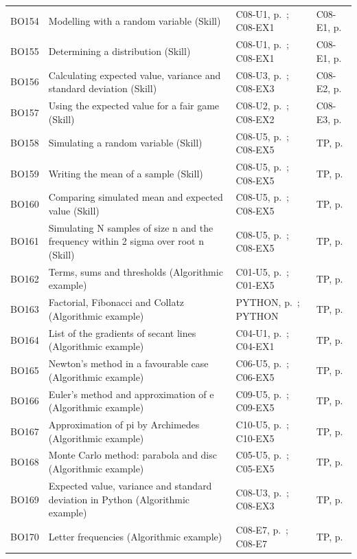 \begin{longtable}{p{.1\linewidth}p{.43\linewidth}p{.19\linewidth}p{.16\linewidth}}
BO154 & Modelling with a random variable (Skill) & C08-U1, p.\,\pageref{C08-U1} ; C08-EX1 & C08-E1, p.\,\pageref{C08-E1} \\
BO155 & Determining a distribution (Skill) & C08-U1, p.\,\pageref{C08-U1} ; C08-EX1 & C08-E1, p.\,\pageref{C08-E1} \\
BO156 & Calculating expected value, variance and standard deviation (Skill) & C08-U3, p.\,\pageref{C08-U3} ; C08-EX3 & C08-E2, p.\,\pageref{C08-E2} \\
BO157 & Using the expected value for a fair game (Skill) & C08-U2, p.\,\pageref{C08-U2} ; C08-EX2 & C08-E3, p.\,\pageref{C08-E3} \\
BO158 & Simulating a random variable (Skill) & C08-U5, p.\,\pageref{C08-U5} ; C08-EX5 & TP, p.\,\pageref{TP} \\
BO159 & Writing the mean of a sample (Skill) & C08-U5, p.\,\pageref{C08-U5} ; C08-EX5 & TP, p.\,\pageref{TP} \\
BO160 & Comparing simulated mean and expected value (Skill) & C08-U5, p.\,\pageref{C08-U5} ; C08-EX5 & TP, p.\,\pageref{TP} \\
BO161 & Simulating N samples of size n and the frequency within 2 sigma over root n (Skill) & C08-U5, p.\,\pageref{C08-U5} ; C08-EX5 & TP, p.\,\pageref{TP} \\
BO162 & Terms, sums and thresholds (Algorithmic example) & C01-U5, p.\,\pageref{C01-U5} ; C01-EX5 & TP, p.\,\pageref{TP} \\
BO163 & Factorial, Fibonacci and Collatz (Algorithmic example) & PYTHON, p.\,\pageref{PYTHON} ; PYTHON & TP, p.\,\pageref{TP} \\
BO164 & List of the gradients of secant lines (Algorithmic example) & C04-U1, p.\,\pageref{C04-U1} ; C04-EX1 & TP, p.\,\pageref{TP} \\
BO165 & Newton's method in a favourable case (Algorithmic example) & C06-U5, p.\,\pageref{C06-U5} ; C06-EX5 & TP, p.\,\pageref{TP} \\
BO166 & Euler's method and approximation of e (Algorithmic example) & C09-U5, p.\,\pageref{C09-U5} ; C09-EX5 & TP, p.\,\pageref{TP} \\
BO167 & Approximation of pi by Archimedes (Algorithmic example) & C10-U5, p.\,\pageref{C10-U5} ; C10-EX5 & TP, p.\,\pageref{TP} \\
BO168 & Monte Carlo method: parabola and disc (Algorithmic example) & C05-U5, p.\,\pageref{C05-U5} ; C05-EX5 & TP, p.\,\pageref{TP} \\
BO169 & Expected value, variance and standard deviation in Python (Algorithmic example) & C08-U3, p.\,\pageref{C08-U3} ; C08-EX3 & TP, p.\,\pageref{TP} \\
BO170 & Letter frequencies (Algorithmic example) & C08-E7, p.\,\pageref{C08-E7} ; C08-E7 & TP, p.\,\pageref{TP} \\
\bottomrule\end{longtable}\normalsize